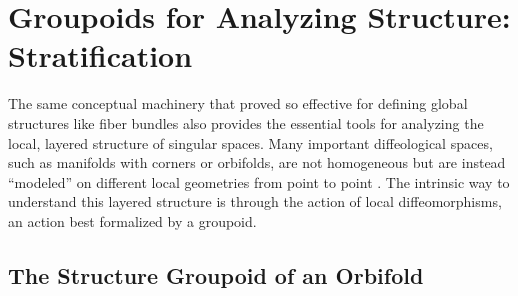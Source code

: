 \documentclass[10pt,reqno,letterpaper,twoside]{amsart}
\theoremstyle{article}
\begin{document}
  
  \section{Groupoids for Analyzing Structure: Stratification}
  
  The same conceptual machinery that proved so effective for defining global structures like fiber bundles also provides the essential tools for analyzing the local,
  layered structure of singular spaces.
  Many important diffeological spaces,
  such as manifolds with corners or orbifolds,
  are not homogeneous but are instead ``modeled'' on different local geometries from point to point \cite[Chap. 4]{PIZ13}. The intrinsic way to understand this layered structure is through the action of local diffeomorphisms, an action best formalized by a groupoid.
  
  \subsection{The Structure Groupoid of an Orbifold}
  
\end{document}
